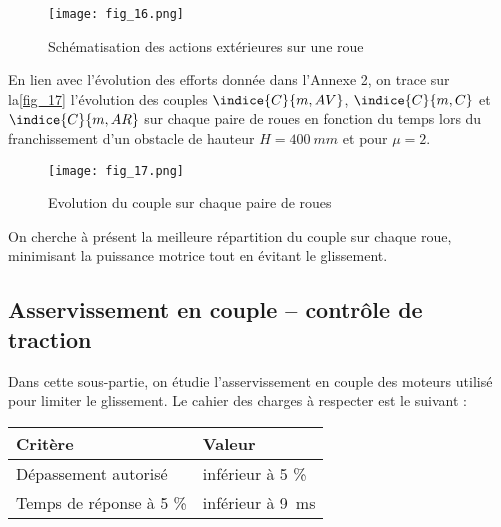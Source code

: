 \begin{figure}[H]
\centering
\texttt{[image: fig\_16.png]}
\caption{Schématisation des actions extérieures sur une roue\label{fig_16}}
\end{figure}


En lien avec l'évolution des efforts donnée dans l'Annexe 2, on trace sur la\autoref{fig_17} l'évolution
des couples $\indice{C}{m, AV}$, $\indice{C}{m,C}$ et $\indice{C}{m,AR}$ sur chaque paire de roues en fonction du temps lors du franchissement d'un obstacle de hauteur $H =\SI{400}{mm}$ et pour $\mu=2$.

\begin{figure}[H]
\centering
\texttt{[image: fig\_17.png]}
\caption{Evolution du couple sur chaque paire de roues\label{fig_17}}
\end{figure}



On cherche à présent la meilleure répartition du couple sur chaque roue, minimisant la puissance
motrice tout en évitant le glissement.



\subsection{Asservissement en couple – contrôle de traction}

\begin{obj}
Dans cette sous-partie, on étudie l’asservissement en couple des moteurs utilisé pour
limiter le glissement. Le cahier des charges à respecter est le suivant :

\begin{center}
\begin{tabular}{ll}
\hline
\textbf{Critère} & \textbf{Valeur} \\ \hline \hline
Dépassement autorisé & inférieur à 5 \% \\ \hline
Temps de réponse à 5 \% & inférieur à \SI{9}{ms} \\ \hline
\end{tabular}
\end{center}

\end{obj}


